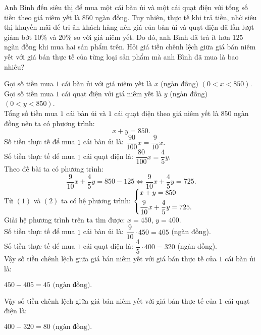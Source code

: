 \begin{ex}%
    Anh Bình đến siêu thị để mua một cái bàn ủi và một cái quạt điện với tổng số tiền theo giá niêm yết là $850$ ngàn đồng. Tuy nhiên, thực tế khi trả tiền, nhờ siêu thị khuyến mãi để tri ân khách hàng nên giá của bàn ủi và quạt điện đã lần lượt giảm bớt $10\%$ và $20\%$ so với giá niêm yết. Do đó, anh Bình đã trả ít hơn $125$ ngàn đồng khi mua hai sản phẩm trên. Hỏi giá tiền chênh lệch giữa giá bán niêm yết với giá bán thực tế của từng loại sản phẩm mà anh Bình đã mua là bao nhiêu?  
\loigiai
    {
    Gọi số tiền mua $1$ cái bàn ủi với giá niêm yết là $x$ (ngàn đồng) $(0<x<850)$.\\
    Gọi số tiền mua $1$ cái quạt điện với giá niêm yết là $y$ (ngàn đồng) $(0<y<850)$.\\
    Tổng số tiền mua $1$ cái bàn ủi và $1$ cái quạt điện theo giá niêm yết là $850$ ngàn đồng nên ta có phương trình: 
    \[x+y=850.\tag{1}\]
    Số tiền thực tế để mua $1$ cái bàn ủi là: $\dfrac{90}{100}x=\dfrac{9}{10}x.$\\
    Số tiền thực tế để mua $1$ cái quạt điện là: $\dfrac{80}{100}x=\dfrac{4}{5}y.$\\
   Theo đề bài ta có phương trình:
\[\dfrac{9}{10}x+\dfrac{4}{5}y=850-125
    \Leftrightarrow \dfrac{9}{10}x+\dfrac{4}{5}y=725.\tag{2}\]
Từ $(1)$ và $(2)$ ta có hệ phương trình: $\left\{\begin{aligned}&x+y=850\\&\dfrac{9}{10}x+\dfrac{4}{5}y=725.\end{aligned}\right.$\\
    Giải hệ phương trình trên ta tìm được: $x=450$, $y=400.$\\
    Số tiền thực tế để mua $1$ cái bàn ủi là: $\dfrac{9}{10}\cdot450=405$ (ngàn đồng).\\
    Số tiền thực tế để mua $1$ cái quạt điện là: $\dfrac{4}{5}\cdot400=320$ (ngàn đồng).\\
    Vậy số tiền chênh lệch giữa giá bán niêm yết với giá bán thực tế của $1$ cái bàn ủi là:
    \begin{center}
    	$450-405=45 \text{ (ngàn đồng).}$
    \end{center}
    Vậy số tiền chênh lệch giữa giá bán niêm yết với giá bán thực tế của $1$ cái quạt điện là:
    \begin{center}
    	$400-320=80 \text{ (ngàn đồng).}$ 
    \end{center}
	}
\end{ex}	
